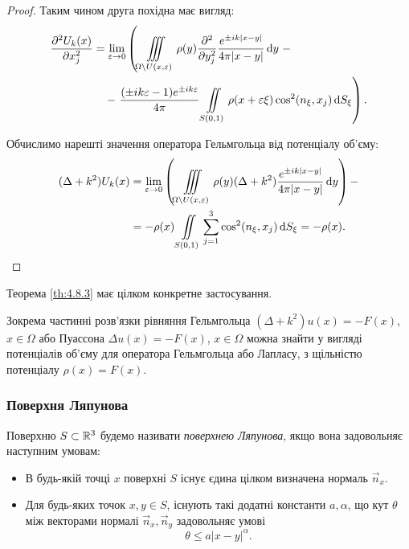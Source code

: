 \begin{proof}
	Таким чином друга похідна має вигляд:
	\begin{equation}
		\begin{aligned}
			\frac{\partial^2 U_k(x)}{\partial x_j^2} &= \displaystyle\lim\limits_{\varepsilon \to 0} \left( \displaystyle\iiint\limits_{\Omega \setminus U(x, \varepsilon)} \rho(y) \frac{\partial^2}{\partial y_j^2} \frac{e^{\pm i k |x - y|}}{4 \pi |x - y|} \mathop{}\!\mathrm{d} y \right. - \\
			& \quad - \left. \frac{(\pm i k \varepsilon - 1) e^{\pm i k \varepsilon}}{4 \pi} \displaystyle\iint\limits_{S(0, 1)} \rho(x + \varepsilon \xi) \cos^2(n_\xi, x_j) \mathop{}\!\mathrm{d} S_\xi \right).
		\end{aligned}
	\end{equation}

	Обчислимо нарешті значення оператора Гельмгольца від потенціалу об'єму:
	\begin{equation}
		\begin{aligned}
			(\Delta + k^2) U_k(x) &= \displaystyle\lim\limits_{\varepsilon \to 0} \left( \displaystyle\iiint\limits_{\Omega \setminus U(x, \varepsilon)} \rho(y) (\Delta + k^2) \frac{e^{\pm i k |x - y|}}{4 \pi |x - y|} \mathop{}\!\mathrm{d} y \right) - \\
			&= - \rho(x) \displaystyle\iint\limits_{S(0, 1)} \displaystyle\sum\limits_{j = 1}^3 \cos^2(n_\xi, x_j) \mathop{}\!\mathrm{d} S_\xi = - \rho(x).
		\end{aligned}
	\end{equation}
\end{proof}

\begin{remark}
	Теорема \ref{th:4.8.3} має цілком конкретне застосування.
\end{remark}

\begin{example}
	Зокрема частинні розв'язки рівняння Гельмгольца $(\Delta + k^2) u(x) = - F(x)$, $x \in \Omega$ або Пуассона $\Delta u(x) = - F(x)$, $x \in \Omega$ можна знайти у вигляді потенціалів об'єму для оператора Гельмгольца або Лапласу, з щільністю потенціалу $\rho(x) = F(x)$.
\end{example}

\subsubsection{Поверхня Ляпунова}

\begin{definition}
	Поверхню $S \subset \mathbb{R}^3$ будемо називати \textit{поверхнею Ляпунова}, якщо вона задовольняє наступним умовам:
	\begin{itemize}
		\item В будь-якій точці $x$ поверхні $S$ існує єдина цілком визначена нормаль $\vec n_x$.
		\item Для будь-яких точок $x, y \in S$, існують такі додатні константи $a, \alpha$, що кут $\theta$ між векторами нормалі $\vec n_x, \vec n_y$ задовольняє умові
		\begin{equation}
			\label{eq:4.8.9}
			\theta \le a |x - y|^\alpha.
		\end{equation}
	\end{itemize}
\end{definition}

